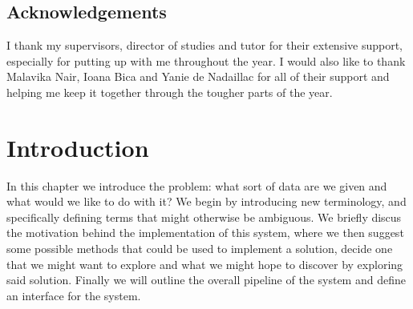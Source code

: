 \documentclass[12pt,twoside,notitlepage]{report}
\begin{document}

\listoffigures

\listoftables

\lstlistoflistings











\clearpage
\section*{Acknowledgements}

I thank my supervisors, director of studies and tutor for their extensive support, especially for putting up with me 
throughout the year. I would also like to thank Malavika Nair, Ioana Bica and Yanie de Nadaillac for 
all of their support and helping me keep it together through the tougher parts of the year.











\cleardoublepage        %

\setcounter{page}{1}
\pagestyle{headings}
















\cleardoublepage
\chapter{Introduction}
    In this chapter we introduce the problem: what sort of data are we given and what would we like to do with it? We 
    begin by introducing new terminology, and specifically defining terms that might otherwise be ambiguous. We briefly 
    discus the motivation behind the implementation of this system, where we then suggest some possible methods that 
    could be used to implement a solution, decide one that we might want to explore and what we might hope to discover 
    by exploring said solution. Finally we will outline the overall pipeline of the system and define an interface for 
    the system.
\end{document}
